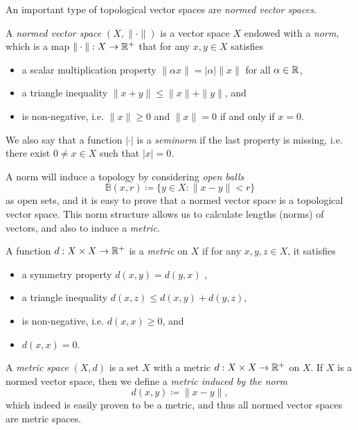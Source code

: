 An important type of topological vector spaces are \emph{normed vector spaces}.
\begin{definition}
    A \emph{normed vector space} $(X,\|\cdot\|)$ is a vector space $X$ endowed with a \emph{norm}, which is a map $\|\cdot\|:X\to \mathbb{R}^+$ that for any $x,y\in X$ satisfies
    \begin{itemize}
        \item a scalar multiplication property $\|\alpha x\|=|\alpha|\|x\|$ for all $\alpha\in\mathbb{R}$,
        \item a triangle inequality $\|x+y\|\leq \|x\|+\|y\|$, and 
        \item is non-negative, i.e. $\|x\|\geq 0$ and $\|x\|=0$ if and only if $x=0$.
    \end{itemize}
    We also say that a function $|\cdot|$ is a \emph{seminorm} if the last property is missing, i.e. there exist $0 \neq x\in X$ such that $|x|=0$.
\end{definition}

A norm will induce a topology by considering \emph{open balls}
\begin{equation}
    \mathbb{B}(x,r) \coloneqq \{y\in X: \|x-y\|<r\}
\end{equation}
as open sets, and it is easy to prove that a normed vector space is a topological vector space. This norm structure allows us to calculate lengths (norms) of vectors, and also to induce a \emph{metric}.
\begin{definition}
    A function $d:X\times X\to \mathbb{R}^+$ is a \emph{metric} on $X$ if for any $x,y,z\in X$, it satisfies
    \begin{itemize}
        \item a symmetry property $d(x,y) = d(y,x)$ ,
        \item a triangle inequality $d(x,z) \leq d(x,y) + d(y,z)$,
        \item is non-negative, i.e. $d(x,x) \geq 0$, and
        \item $d(x,x)=0$.
    \end{itemize}
    A \emph{metric space} $(X,d)$ is a set $X$ with a metric $d:X\times X\to \mathbb{R}^+$ on $X$. If $X$ is a normed vector space, then we define a \emph{metric induced by the norm} 
    \begin{equation}
        d(x,y) \coloneqq \|x-y\|,
    \end{equation}
    which indeed is easily proven to be a metric, and thus all normed vector spaces are metric spaces. 
\end{definition}


